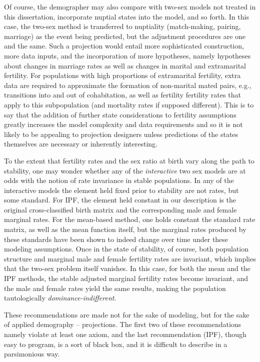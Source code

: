 Of course, the demographer may also compare with two-sex models not treated
in this dissertation, incorporate nuptial states into the model, and so
forth. In this case, the two-sex method is transferred to nuptiality
(match-making, pairing, marriage) as the event being predicted, but the
adjustment procedures are one and the same. Such a projection would
entail more sophisticated construction, more data inputs, and the incorporation of more hypotheses,
namely hypotheses about changes in marriage rates as well as changes in marital
and extramarital fertility. For populations with high proportions of
extramarital fertility, extra data are required to approximate the formation of
non-marital mated pairs, e.g., transitions into and out of cohabitation, as well
as fertility fertility rates that apply to this subpopulation (and mortality
rates if supposed different). This is to say that the addition of further state
considerations to fertility assumptions greatly increases the model complexity
and data requirements and so it is not likely to be appealing to projection
designers unless predictions of the states themselves are necessary or
inherently interesting.

To the extent that fertility rates and the sex ratio at
birth vary along the path to stability, one may wonder whether any of the
\textit{interactive} two sex models are at odds with the notion of
rate invariance in stable populations. In any of the
interactive models the element held fixed prior to stability are not rates, but
some standard. For IPF, the element held constant in our 
description is the original cross-classified birth matrix and the corresponding 
male and female marginal rates. For the mean-based method, one holds constant 
the standard rate matrix, as well as the mean function itself, but the marginal 
rates produced by these standards have been shown to indeed change over time
under these modeling assumptions. Once in the state of stability, of
course, both population structure and marginal male and female fertility rates are invariant, which
implies that the two-sex problem itself vanishes. In this case, for both the
mean and the IPF methods, the stable adjusted marginal fertility rates become
invariant, and the male and female rates yield the same results, making the
population tautologically \textit{dominance-indifferent}.

These recommendations are made not for the sake of modeling, but for the sake of
applied demography -- projections. The first two of these recommendations namely
violate at least one axiom, and the last recommendation (IPF), though easy to
program, is a sort of black box, and it is difficult to describe in a
parsimonious way.
